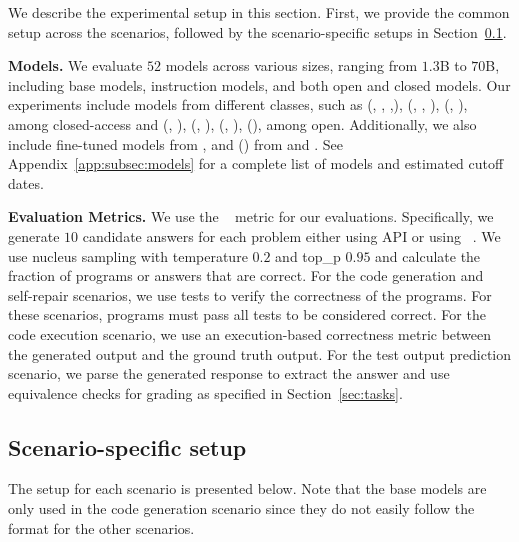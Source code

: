 We describe the experimental setup in this section.
First, we provide the common setup across the scenarios, followed by the scenario-specific setups in Section~\ref{subsec:scenario_specific_setup}.

\vspace{2pt}
\noindent \textbf{Models.} 
We evaluate $52$ models across various sizes, ranging from $1.3$B to $70$B, including base models, instruction models, and both open and closed models. 
Our experiments include models from different classes, such as \gpts{} (\gptthreefiveturbo{}, \gptfour{}, \gptfourturbo{},\gptfouro{}), \claudes{} (\claudeinstantone{}, \claudetwo{}, \claudethrees{}), \geminis{}(\geminipro{}, \geminiflash{}), \mistral{} among closed-access and \llamas{}(\llamabaselist{}, \llamainslist{}), \deepseeks{} (\deepseekcodebaseBList{}, \deepseekcodeBList{}), \cllamas{} (\cllamaBList{}, \cllamabaseBList{}), \starcodertwo{} (\sctwobaseBList{}), \codeqwen{} among open.
Additionally, we also include fine-tuned models \phind{} from , and \magicoders{} (\magicoderBLit{}) from  and .
See Appendix~\ref{app:subsec:models} for a complete list of models and estimated cutoff dates. %

\vspace{2pt}
\noindent \textbf{Evaluation Metrics.}
We use the ~\citep{kulal2019spoc,chen2021evaluating} metric for our evaluations. 
Specifically, we generate $10$ candidate answers for each problem either using API or using ~\citep{kwon2023efficient}.
We use nucleus sampling with temperature $0.2$ and top\_p $0.95$ and calculate the fraction of programs or answers that are correct. 
For the code generation and self-repair scenarios, we use tests to verify the correctness of the programs. For these scenarios, programs must pass all tests to be considered correct.
For the code execution scenario, we use an execution-based correctness metric between the generated output and the ground truth output. For the test output prediction scenario, we parse the generated response to extract the answer and use equivalence checks for grading as specified in Section~\ref{sec:tasks}.

\subsection{Scenario-specific setup}
\label{subsec:scenario_specific_setup}
The setup for each scenario is presented below.
Note that the base models are only used in the code generation scenario since they do not easily follow the format for the other scenarios.

